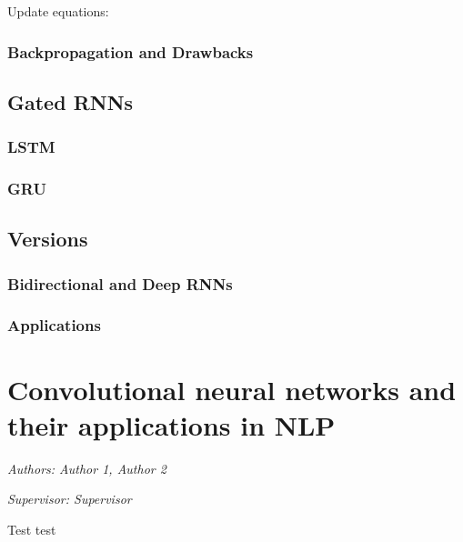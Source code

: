 \documentclass[]{krantz}
\begin{document}
Update equations:

\hypertarget{backpropagation-and-drawbacks}{%
\subsection{Backpropagation and Drawbacks}\label{backpropagation-and-drawbacks}}

\hypertarget{gated-rnns}{%
\section{Gated RNNs}\label{gated-rnns}}

\hypertarget{lstm}{%
\subsection{LSTM}\label{lstm}}

\hypertarget{gru}{%
\subsection{GRU}\label{gru}}

\hypertarget{versions}{%
\section{Versions}\label{versions}}

\hypertarget{bidirectional-and-deep-rnns}{%
\subsection{Bidirectional and Deep RNNs}\label{bidirectional-and-deep-rnns}}

\hypertarget{applications}{%
\subsection{Applications}\label{applications}}

\hypertarget{convolutional-neural-networks-and-their-applications-in-nlp}{%
\chapter{Convolutional neural networks and their applications in NLP}\label{convolutional-neural-networks-and-their-applications-in-nlp}}

\emph{Authors: Author 1, Author 2}

\emph{Supervisor: Supervisor}

Test test
\end{document}
